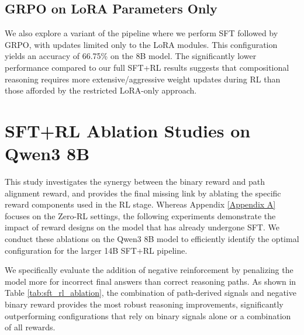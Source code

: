 \documentclass{article}
\theoremstyle{plain}
\theoremstyle{definition}
\theoremstyle{remark}
\begin{document}
\subsection{GRPO on LoRA Parameters Only}
We also explore a variant of the pipeline where we perform SFT followed by GRPO, with updates limited only to the LoRA modules. This configuration yields an accuracy of 66.75\% on the 8B model. The significantly lower performance compared to our full SFT+RL results suggests that compositional reasoning requires more extensive/aggressive weight updates during RL than those afforded by the restricted LoRA-only approach.

\newpage
\section{SFT+RL Ablation Studies on Qwen3 8B}
\label{Appendix B}
This study investigates the synergy between the binary reward and path alignment reward, and provides the final missing link by ablating the specific reward components used in the RL stage. Whereas Appendix \ref{Appendix A} focuses on the Zero-RL settings, the following experiments demonstrate the impact of reward designs on the model that has already undergone SFT. We conduct these ablations on the Qwen3 8B model to efficiently identify the optimal configuration for the larger 14B SFT+RL pipeline.

We specifically evaluate the addition of negative reinforcement \cite{Zhu2025} by penalizing the model more for incorrect final answers than correct reasoning paths. As shown in Table \ref{tab:sft_rl_ablation}, the combination of path-derived signals and negative binary reward provides the most robust reasoning improvements, significantly outperforming configurations that rely on binary signals alone or a combination of all rewards.
\end{document}
